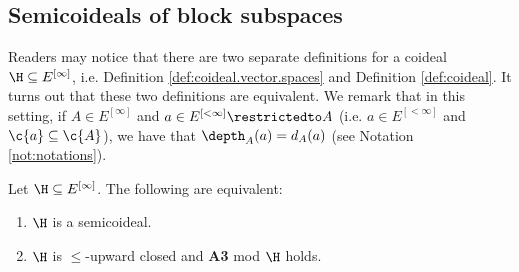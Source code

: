 \documentclass[11pt,reqno]{amsart}
\begin{document}
\subsection{Semicoideals of block subspaces}
Readers may notice that there are two separate definitions for a coideal $\H \subseteq E^{[\infty]}$, i.e. Definition \ref{def:coideal.vector.spaces} and Definition \ref{def:coideal}. It turns out that these two definitions are equivalent. We remark that in this setting, if $A \in E^{[\infty]}$ and $a \in E^{[<\infty]}\restrictedto A$ (i.e. $a \in E^{[<\infty]}$ and $\c{a} \subseteq \c{A}$), we have that $\depth_A(a) = d_A(a)$ (see Notation \ref{not:notations}).

\begin{lemma}
    Let $\H \subseteq E^{[\infty]}$. The following are equivalent:
    \begin{enumerate}
        \item $\H$ is a semicoideal.
        
        \item $\H$ is $\leq$-upward closed and \textbf{A3} mod $\H$ holds.
    \end{enumerate}
\end{lemma}
\end{document}
